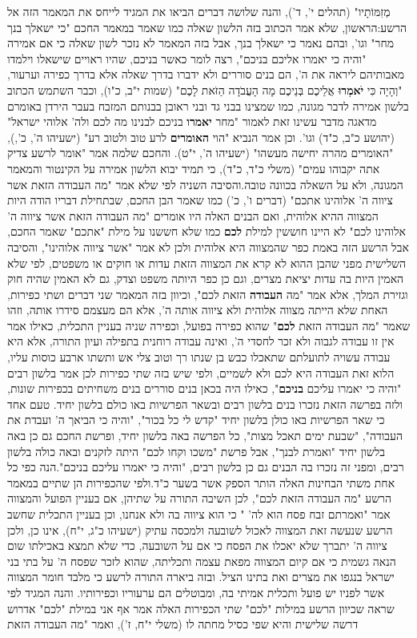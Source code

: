\documentclass[12pt, openany]{book}
\begin{document}
מְזִמּוֹתָיו" (תהלים י', ד'), והנה שלושה דברים הביאו את המגיד לייחס את המאמר הזה אל הרשע:הראשון, שלא אמר הכתוב בזה הלשון שאלה כמו שאמר במאמר החכם "כי ישאלך בנך מחר" וגו', ובהם נאמר כי ישאלך בנך, אבל בזה המאמר לא נזכר לשון שאלה כי אם אמירה "והיה כי יאמרו אליכם בניכם", רצה לומר כאשר בניכם, שהיו ראויים שישאלו וילמדו מאבותיהם ליראה את ה', הם בנים סוררים ולא ידברו בדרך שאלה אלא בדרך כפירה וערעור, "וְהָיָה כִּי \textrm{\textbf{יֹאמְרוּ}} אֲלֵיכֶם בְּנֵיכֶם מָה הָעֲבֹדָה הַזֹּאת לָכֶם" (שמות י"ב, כ"ו), וכבר השתמש הכתוב בלשון אמירה לדבר מגונה, כמו שמצינו בבני גד ובני ראובן בבנותם המזבח בעבר הירדן באומרם מדאגה מדבר עשינו זאת לאמור "מחר \textrm{\textbf{יאמרו}} בניכם לבנינו מה לכם ולה' אלוהי ישראל" (יהושע כ"ב, כ"ד) וגו'. וכן אמר הנביא "הוי \textrm{\textbf{האומרים}} לרע טוב ולטוב רע" (ישעיהו ה', כ',), "האומרים מהרה יחישה מעשהו" (ישעיהו ה', י"ט). והחכם שלמה אמר "אומר לרשע צדיק אתה יקבוהו עמים" (משלי כ"ד, כ"ד), כי תמיד יבוא הלשון אמירה על הקינטור והמאמר המגונה, ולא על השאלה בכוונה טובה.והסיבה השניה לפי שלא אמר "מה העבודה הזאת אשר ציווה ה' אלוהינו אתכם" (דברים ו', כ') כמו שאמר הבן החכם, שבתחילת דבריו הודה היות המצווה ההיא אלוהית, ואם הבנים האלה היו אומרים "מה העבודה הזאת אשר ציווה ה' אלוהינו לכם" לא היינו חוששין למילת \textrm{\textbf{לכם}} כמו שלא חששנו על מילת "אתכם" שאמר החכם, אבל הרשע הזה באמת כפר שהמצווה היא אלוהית ולכן לא אמר "אשר ציווה אלוהינו", והסיבה השלישית מפני שהבן ההוא לא קרא את המצווה הזאת עדות או חוקים או משפטים, לפי שלא האמין היות בה עדות יציאת מצרים, וגם כן כפר היותה משפט וצדק, גם לא האמין שהיה חוק וגזירת המלך, אלא אמר "מה \textrm{\textbf{העבודה}} הזאת לכם", וכיוון בזה המאמר שני דברים ושתי כפירות, האחת שלא הייתה מצווה אלוהית ולא ציווה אותה ה', אלא הם מעצמם סידרו אותה, וזהו שאמר "מה העבודה הזאת \textrm{\textbf{לכם}}" שהוא כפירה בפועל, וכפירה שניה בעניין התכלית, כאילו אמר אין זו עבודה לגבוה ולא זכר לחסדי ה', ואינה עבודה רוחנית בתפילה ועיון התורה, אלא היא עבודה עשויה לתועלתם שתאכלו כבש בן שנתו רך וטוב צלי אש ותשתו ארבע כוסות עליו, הלוא זאת העבודה היא לכם ולא לשמיים, ולפי שיש בזה שתי כפירות לכן אמר בלשון רבים "והיה כי יאמרו עליכם \textrm{\textbf{בניכם}}", כאילו היה בכאן בנים סוררים בנים משחיתים בכפירות שונות, ולזה בפרשה הזאת נזכרו בנים בלשון רבים ובשאר הפרשיות באו כולם בלשון יחיד. טעם אחד כי שאר הפרשיות באו כולן בלשון יחיד "קדש לי כל בכור", "והיה כי הביאך ה' ועבדת את העבודה", "שבעת ימים תאכל מצות", כל הפרשה באה בלשון יחיד, ופרשת החכם גם כן באה בלשון יחיד "ואמרת לבנך", אבל פרשת "משכו וקחו לכם" היתה לזקנים ובאה כולה בלשון רבים, ומפני זה נזכרו בה הבנים גם כן בלשון רבים, "והיה כי יאמרו עליכם בניכם".הנה כפי כל אחת משתי הבחינות האלה הותר הספק אשר בשער כ"ד.ולפי שהכפירות הן שתיים במאמר הרשע "מה העבודה הזאת לכם", לכן השיבה התורה על שתיהן, אם בעניין הפועל והמצווה אמר "ואמרתם זבח פסח הוא לה' " כי הוא ציווה בה ולא אנחנו, וכן בעניין התכלית שחשב הרשע שנעשה זאת המצווה לאכול לשובעה  ולמכסה עתיק (ישעיהו כ"ג, י"ח), אינו כן, ולכן ציווה ה' יתברך שלא יאכלו את הפסח כי אם על השובעה, כדי שלא תמצא באכילתו שום הנאה גשמית כי אם קיום המצווה מפאת עצמה ותכליתה, שהוא לזכר שפסח ה' על בתי בני ישראל בנגפו את מצרים ואת בתינו הציל. ובזה ביארה התורה לרשע כי מלבד חומר המצווה אשר לפניו יש פועל ותכלית אמיתי בה, ומבוטלים הם ערעוריו וכפירותיו. והנה המגיד לפי שראה שכיוון הרשע במילות "לכם" שתי הכפירות האלה אמר אף אני במילת "לכם" אדרוש דרשה שלישית והיא שפי כסיל מחתה לו (משלי י"ח, ז'), ואמר "מה העבודה הזאת 
\end{document}
